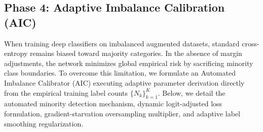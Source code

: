 \documentclass{ieeeaccess}
\begin{document}
\subsection{Phase 4: Adaptive Imbalance Calibration (AIC)}
\label{subsec:phase4}

When training deep classifiers on imbalanced augmented datasets, standard cross-entropy remains biased toward majority categories. In the absence of margin adjustments, the network minimizes global empirical risk by sacrificing minority class boundaries. To overcome this limitation, we formulate an Automated Imbalance Calibrator (AIC) executing adaptive parameter derivation directly from the empirical training label counts $\{N_k\}_{k=1}^{K}$. Below, we detail the automated minority detection mechanism, dynamic logit-adjusted loss formulation, gradient-starvation oversampling multiplier, and adaptive label smoothing regularization.
\end{document}
